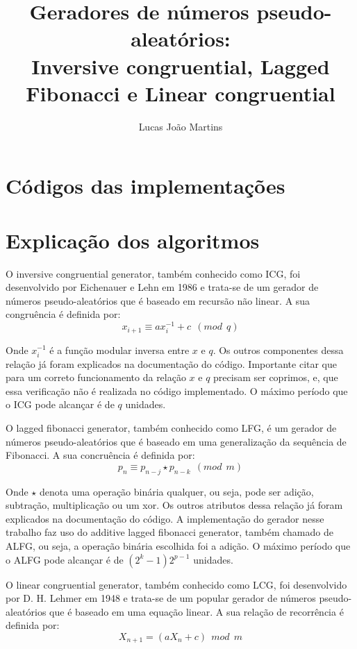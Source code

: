 \documentclass[12pt]{article}
\title{
  Geradores de números pseudo-aleatórios: \\
  \large Inversive congruential, Lagged Fibonacci e Linear congruential}
\author{Lucas João Martins}
\date{}
\begin{document}
\maketitle

\section{Códigos das implementações}




\section{Explicação dos algoritmos}
O inversive congruential generator, também conhecido como ICG, foi desenvolvido
por Eichenauer e Lehn em 1986 e trata-se de um gerador de números
pseudo-aleatórios que é baseado em recursão não linear. A sua congruência é
definida por:
\begin{equation}
  x_{i+1} \equiv ax_i^{-1} + c \ \ (mod \ \ q)
\end{equation}

Onde $x_i^{-1}$ é a função modular inversa entre $x$ e $q$. Os outros
componentes dessa relação já foram explicados na documentação do código.
Importante citar que para um correto funcionamento da relação $x$ e $q$ precisam
ser coprimos, e, que essa verificação não é realizada no código implementado. O
máximo período que o ICG pode alcançar é de $q$ unidades.

O lagged fibonacci generator, também conhecido como LFG, é um gerador de números
pseudo-aleatórios que é baseado em uma generalização da sequência de Fibonacci.
A sua concruência é definida por:
\begin{equation}
  p_{n} \equiv p_{n-j} \star p_{n-k} \ \ (mod \ \ m)
\end{equation}

Onde $\star$ denota uma operação binária qualquer, ou seja, pode ser adição,
subtração, multiplicação ou um xor. Os outros atributos dessa relação já foram
explicados na documentação do código. A implementação do gerador nesse trabalho
faz uso do additive lagged fibonacci generator, também chamado de ALFG, ou seja,
a operação binária escolhida foi a adição. O máximo período que o ALFG pode
alcançar é de $(2^k - 1)2^{p-1}$ unidades.

O linear congruential generator, também conhecido como LCG, foi desenvolvido por
D. H. Lehmer em 1948 e trata-se de um popular gerador de números
pseudo-aleatórios que é baseado em uma equação linear. A sua relação de
recorrência é definida por:
\begin{equation}
  X_{n+1} = (aX_n + c) \ \ mod \ \ m
\end{equation}
\end{document}
